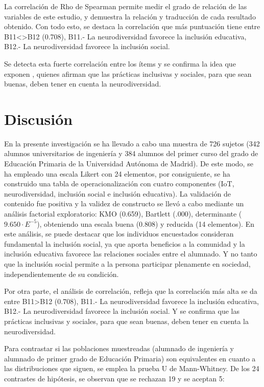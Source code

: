 \documentclass[spanish]{textolivre}
\begin{document}
La correlación de Rho de Spearman permite medir el grado de relación de las variables de este estudio, y demuestra la relación y traducción de cada resultado obtenido. Con todo esto, se destaca la correlación que más puntuación tiene entre B11<>B12 (0.708), B11.- La neurodiversidad favorece la inclusión educativa, B12.- La neurodiversidad favorece la inclusión social.

Se detecta esta fuerte correlación entre los ítems y se confirma la idea que exponen \textcite{messiou_inclusive_2021}, quienes afirman que las prácticas inclusivas y sociales, para que sean buenas, deben tener en cuenta la neurodiversidad.

\section{Discusión}

En la presente investigación se ha llevado a cabo una muestra de 726 sujetos (342 alumnos universitarios de ingeniería y 384 alumnos del primer curso del grado de Educación Primaria de la Universidad Autónoma de Madrid). De este modo, se ha empleado una escala Likert con 24 elementos, por consiguiente, se ha construido una tabla de operacionalización con cuatro componentes (IoT, neurodiversidad, inclusión social e inclusión educativa). La validación de contenido fue positiva y la validez de constructo se llevó a cabo mediante un análisis factorial exploratorio: KMO (0.659), Bartlett (.000), determinante ($9.650\cdot E^{-5}$), obteniendo una escala buena (0.808) y reducida (14 elementos). En este análisis, se puede destacar que los individuos encuestados consideran fundamental la inclusión social, ya que aporta beneficios a la comunidad y la inclusión educativa favorece las relaciones sociales entre el alumnado. Y no tanto que la inclusión social permite a la persona participar plenamente en sociedad, independientemente de su condición.

Por otra parte, el análisis de correlación, refleja que la correlación más alta se da entre B11>B12 (0.708), B11.- La neurodiversidad favorece la inclusión educativa, B12.- La neurodiversidad favorece la inclusión social. Y se confirma que las prácticas inclusivas y sociales, para que sean buenas, deben tener en cuenta la neurodiversidad.

Para contrastar si las poblaciones muestreadas (alumnado de ingeniería y alumnado de primer grado de Educación Primaria) son equivalentes en cuanto a las distribuciones que siguen, se emplea la prueba U de Mann-Whitney. De los 24 contrastes de hipótesis, se observan que se rechazan 19 y se aceptan 5:
\end{document}

